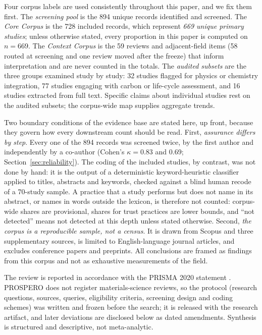 \documentclass[pdflatex,sn-basic]{sn-jnl}
\begin{document}
Four corpus labels are used consistently throughout this paper, and we fix them first. The \emph{screening pool} is the 894 unique records identified and screened. The \emph{Core Corpus} is the 728 included records, which represent \emph{669 unique primary studies}; unless otherwise stated, every proportion in this paper is computed on $n = 669$. The \emph{Context Corpus} is the 59 reviews and adjacent-field items (58 routed at screening and one review moved after the freeze) that inform interpretation and are never counted in the totals. The \emph{audited subsets} are the three groups examined study by study: 32 studies flagged for physics or chemistry integration, 77 studies engaging with carbon or life-cycle assessment, and 16 studies extracted from full text. Specific claims about individual studies rest on the audited subsets; the corpus-wide map supplies aggregate trends.

Two boundary conditions of the evidence base are stated here, up front, because they govern how every downstream count should be read. First, \emph{assurance differs by step}. Every one of the 894 records was screened twice, by the first author and independently by a co-author (Cohen's $\kappa = 0.83$ and 0.69; Section~\ref{sec:reliability}). The coding of the included studies, by contrast, was not done by hand: it is the output of a deterministic keyword-heuristic classifier applied to titles, abstracts and keywords, checked against a blind human recode of a 70-study sample. A practice that a study performs but does not name in its abstract, or names in words outside the lexicon, is therefore not counted: corpus-wide shares are provisional, shares for trust practices are lower bounds, and ``not detected'' means not detected at this depth unless stated otherwise. Second, \emph{the corpus is a reproducible sample, not a census}. It is drawn from Scopus and three supplementary sources, is limited to English-language journal articles, and excludes conference papers and preprints. All conclusions are framed as findings from this corpus and not as exhaustive measurements of the field.

The review is reported in accordance with the PRISMA 2020 statement \citep{page2021}. PROSPERO does not register materials-science reviews, so the protocol (research questions, sources, queries, eligibility criteria, screening design and coding schemes) was written and frozen before the search; it is released with the research artifact, and later deviations are disclosed below as dated amendments. Synthesis is structured and descriptive, not meta-analytic.
\end{document}
